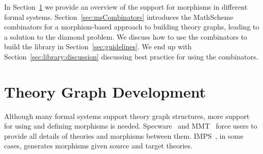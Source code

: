 In Section~\ref{sec:thry_graph_in_action} we provide an overview of the support for morphisms in different formal systems. Section~\ref{sec:msCombinators} introduces the MathScheme combinators for a morphism-based approach to building theory graphs, leading to a solution to the diamond problem. We discuss how to use the combinators to build the library in Section~\ref{sec:guidelines}. We end up with Section~\ref{sec:library:discussion} discussing best practice for using the combinators. 

\begin{comment}
To test our generation algorithms, we needed a large library of equational theories. As we have discussed in Section~\ref{sec:broader_context}, we work in the favor of a library organized as a theory graph, believing that it leverages the structure of mathematical knowledge. Morphisms of the graph are the means to relating the different theories. In this section, we present our approach to building a library that emphasizes these connections. 

In Section~\ref{sec:thry_based_libs} we discuss the motivation behind building such a library. In Section~\ref{sec:ms_combinators} we present the combinators used in building it and discuss how they are morphism based. Section~\ref{sec:lib_implementation}, discusses the challenges of the implementation of the combinators to build a theory graph. We finally show some interesting cases of library definitions in Section~\ref{sec:interesting_cases}. 
\end{comment}


\section{Theory Graph Development}
\label{sec:thry_graph_in_action}

Although many formal systems support theory graph structures, more support for using and defining morphisms is needed. 
Specware~\cite{Smith99} and MMT~\cite{MMT} force users to provide all details of theories and morphisms between them. IMPS~\cite{farmer1993imps}, in some cases, generates morphisms given source and target theories. 


